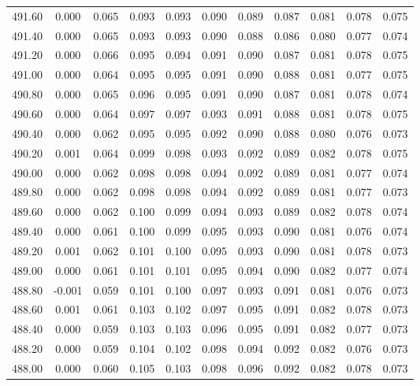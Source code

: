 \begin{longtable}{cccccccccc}
    491.60 &  0.000 &  0.065 &  0.093 &  0.093 &  0.090 &  0.089 &  0.087 &  0.081 &  0.078 &  0.075 \\
    491.40 &  0.000 &  0.065 &  0.093 &  0.093 &  0.090 &  0.088 &  0.086 &  0.080 &  0.077 &  0.074 \\
    491.20 &  0.000 &  0.066 &  0.095 &  0.094 &  0.091 &  0.090 &  0.087 &  0.081 &  0.078 &  0.075 \\
    491.00 &  0.000 &  0.064 &  0.095 &  0.095 &  0.091 &  0.090 &  0.088 &  0.081 &  0.077 &  0.075 \\
    490.80 &  0.000 &  0.065 &  0.096 &  0.095 &  0.091 &  0.090 &  0.087 &  0.081 &  0.078 &  0.074 \\
    490.60 &  0.000 &  0.064 &  0.097 &  0.097 &  0.093 &  0.091 &  0.088 &  0.081 &  0.078 &  0.075 \\
    490.40 &  0.000 &  0.062 &  0.095 &  0.095 &  0.092 &  0.090 &  0.088 &  0.080 &  0.076 &  0.073 \\
    490.20 &  0.001 &  0.064 &  0.099 &  0.098 &  0.093 &  0.092 &  0.089 &  0.082 &  0.078 &  0.075 \\
    490.00 &  0.000 &  0.062 &  0.098 &  0.098 &  0.094 &  0.092 &  0.089 &  0.081 &  0.077 &  0.074 \\
    489.80 &  0.000 &  0.062 &  0.098 &  0.098 &  0.094 &  0.092 &  0.089 &  0.081 &  0.077 &  0.073 \\
    489.60 &  0.000 &  0.062 &  0.100 &  0.099 &  0.094 &  0.093 &  0.089 &  0.082 &  0.078 &  0.074 \\
    489.40 &  0.000 &  0.061 &  0.100 &  0.099 &  0.095 &  0.093 &  0.090 &  0.081 &  0.076 &  0.074 \\
    489.20 &  0.001 &  0.062 &  0.101 &  0.100 &  0.095 &  0.093 &  0.090 &  0.081 &  0.078 &  0.073 \\
    489.00 &  0.000 &  0.061 &  0.101 &  0.101 &  0.095 &  0.094 &  0.090 &  0.082 &  0.077 &  0.074 \\
    488.80 & -0.001 &  0.059 &  0.101 &  0.100 &  0.097 &  0.093 &  0.091 &  0.081 &  0.076 &  0.073 \\
    488.60 &  0.001 &  0.061 &  0.103 &  0.102 &  0.097 &  0.095 &  0.091 &  0.082 &  0.078 &  0.073 \\
    488.40 &  0.000 &  0.059 &  0.103 &  0.103 &  0.096 &  0.095 &  0.091 &  0.082 &  0.077 &  0.073 \\
    488.20 &  0.000 &  0.059 &  0.104 &  0.102 &  0.098 &  0.094 &  0.092 &  0.082 &  0.076 &  0.073 \\
    488.00 &  0.000 &  0.060 &  0.105 &  0.103 &  0.098 &  0.096 &  0.092 &  0.082 &  0.078 &  0.073 \\

\end{longtable}

